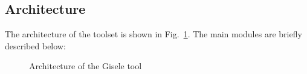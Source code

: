 \subsection*{Architecture}

The architecture of the toolset is shown in Fig.~\ref{image:gisele-tool-architecture}. The main modules are briefly described below:

\begin{figure}
\centering{}
  \caption{Architecture of the Gisele tool\label{image:gisele-tool-architecture}}
\end{figure}

